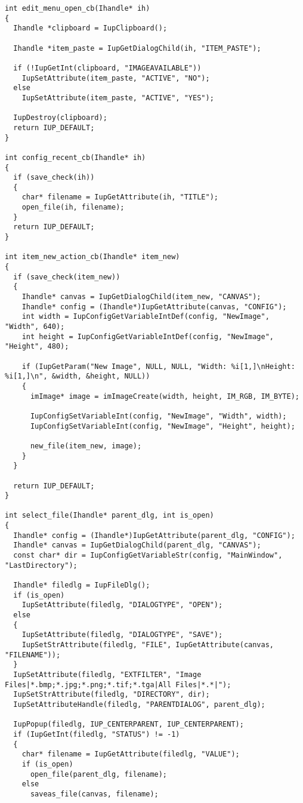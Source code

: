 \documentclass{ctexart}
\begin{document}
\begin{lstlisting}
int edit_menu_open_cb(Ihandle* ih)
{
  Ihandle *clipboard = IupClipboard(); 

  Ihandle *item_paste = IupGetDialogChild(ih, "ITEM_PASTE");

  if (!IupGetInt(clipboard, "IMAGEAVAILABLE"))
    IupSetAttribute(item_paste, "ACTIVE", "NO");
  else
    IupSetAttribute(item_paste, "ACTIVE", "YES");

  IupDestroy(clipboard);
  return IUP_DEFAULT;
}

int config_recent_cb(Ihandle* ih)
{
  if (save_check(ih))
  {
    char* filename = IupGetAttribute(ih, "TITLE");
    open_file(ih, filename);
  }
  return IUP_DEFAULT;
}

int item_new_action_cb(Ihandle* item_new)
{
  if (save_check(item_new))
  {
    Ihandle* canvas = IupGetDialogChild(item_new, "CANVAS");
    Ihandle* config = (Ihandle*)IupGetAttribute(canvas, "CONFIG");
    int width = IupConfigGetVariableIntDef(config, "NewImage", "Width", 640);
    int height = IupConfigGetVariableIntDef(config, "NewImage", "Height", 480);

    if (IupGetParam("New Image", NULL, NULL, "Width: %i[1,]\nHeight: %i[1,]\n", &width, &height, NULL))
    {
      imImage* image = imImageCreate(width, height, IM_RGB, IM_BYTE);

      IupConfigSetVariableInt(config, "NewImage", "Width", width);
      IupConfigSetVariableInt(config, "NewImage", "Height", height);

      new_file(item_new, image);
    }
  }

  return IUP_DEFAULT;
}

int select_file(Ihandle* parent_dlg, int is_open)
{
  Ihandle* config = (Ihandle*)IupGetAttribute(parent_dlg, "CONFIG");
  Ihandle* canvas = IupGetDialogChild(parent_dlg, "CANVAS");
  const char* dir = IupConfigGetVariableStr(config, "MainWindow", "LastDirectory");

  Ihandle* filedlg = IupFileDlg();
  if (is_open)
    IupSetAttribute(filedlg, "DIALOGTYPE", "OPEN");
  else
  {
    IupSetAttribute(filedlg, "DIALOGTYPE", "SAVE");
    IupSetStrAttribute(filedlg, "FILE", IupGetAttribute(canvas, "FILENAME"));
  }
  IupSetAttribute(filedlg, "EXTFILTER", "Image Files|*.bmp;*.jpg;*.png;*.tif;*.tga|All Files|*.*|");
  IupSetStrAttribute(filedlg, "DIRECTORY", dir);
  IupSetAttributeHandle(filedlg, "PARENTDIALOG", parent_dlg);

  IupPopup(filedlg, IUP_CENTERPARENT, IUP_CENTERPARENT);
  if (IupGetInt(filedlg, "STATUS") != -1)
  {
    char* filename = IupGetAttribute(filedlg, "VALUE");
    if (is_open)
      open_file(parent_dlg, filename);
    else
      saveas_file(canvas, filename);


\end{lstlisting}
\end{document}
